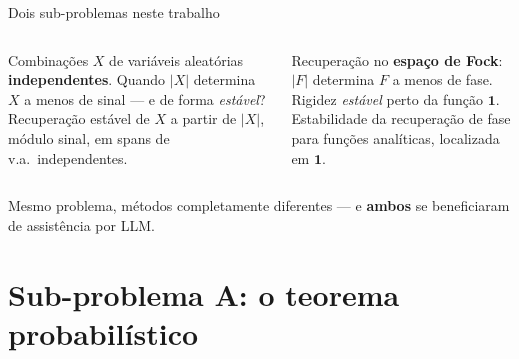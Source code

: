 \documentclass[10pt,aspectratio=169]{beamer}
\newcommand{\abs}[1]{\left|#1\right|}
\newcommand{\hl}[1]{{\color{accent}\textbf{#1}}}
\newcommand{\hlb}[1]{{\color{accent2}\textbf{#1}}}
\newcommand{\hlo}[1]{{\color{accent3}\textbf{#1}}}
\newcommand{\fade}[1]{{\color{fgmute}#1}}
\begin{document}
\begin{frame}{Dois sub-problemas neste trabalho}
  \vspace{0.3em}
  \begin{columns}[T,onlytextwidth]
    \begin{tcolorbox}[colback=bgpanel,colframe=accent2,coltext=fgmain,
                       arc=2pt,boxrule=0.5pt,
                       left=8pt,right=8pt,top=6pt,bottom=6pt,
                       title={\sffamily\bfseries\small Sub-problema A
                              --- ``sabor probabilístico''},
                       coltitle=bgdark,fonttitle=\small]
      \small
      Combinações $X$ de variáveis aleatórias \hlb{independentes}.
      Quando $\abs{X}$ determina $X$ a menos de sinal --- e de forma
      \emph{estável}?\\[0.3em]
      \fade{\scriptsize Recuperação estável de $X$ a partir de
      $\abs{X}$, módulo sinal, em spans de v.a.\ independentes.}
    \end{tcolorbox}
    \pause

    \begin{tcolorbox}[colback=bgpanel,colframe=accent3,coltext=fgmain,
                       arc=2pt,boxrule=0.5pt,
                       left=8pt,right=8pt,top=6pt,bottom=6pt,
                       title={\sffamily\bfseries\small Sub-problema B
                              --- ``sabor analítico''},
                       coltitle=bgdark,fonttitle=\small]
      \small
      Recuperação no \hlo{espaço de Fock}: $\abs{F}$
      determina $F$ a menos de fase. Rigidez \emph{estável} perto da
      função $\mathbf{1}$.\\[0.3em]
      \fade{\scriptsize Estabilidade da recuperação de fase para
      funções analíticas, localizada em $\mathbf{1}$.}
    \end{tcolorbox}
  \end{columns}

  \vspace{0.8em}
  \pause
  \begin{center}\small\color{fgmute}
    Mesmo problema, métodos completamente diferentes ---
    e \hl{ambos} se beneficiaram de assistência por LLM.
  \end{center}
\end{frame}

\section{Sub-problema A: o teorema probabilístico}
\end{document}
